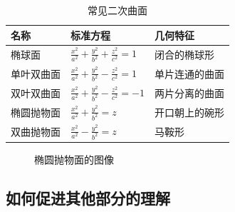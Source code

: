 \begin{table}[htbp]
\centering
\caption{常见二次曲面}
\begin{tabularx}{0.95\textwidth}{llX}
\toprule
\textbf{名称} & \textbf{标准方程} & \textbf{几何特征} \\
\midrule
椭球面 & $\frac{x^2}{a^2}+\frac{y^2}{b^2}+\frac{z^2}{c^2}=1$ & 闭合的椭球形 \\
单叶双曲面 & $\frac{x^2}{a^2}+\frac{y^2}{b^2}-\frac{z^2}{c^2}=1$ & 单片连通的曲面 \\
双叶双曲面 & $\frac{x^2}{a^2}+\frac{y^2}{b^2}-\frac{z^2}{c^2}=-1$ & 两片分离的曲面 \\
椭圆抛物面 & $\frac{x^2}{a^2}+\frac{y^2}{b^2}=z$ & 开口朝上的碗形 \\
双曲抛物面 & $\frac{x^2}{a^2}-\frac{y^2}{b^2}=z$ & 马鞍形 \\
\bottomrule
\end{tabularx}
\end{table}

\begin{figure}[htbp]
\centering
{}
\caption{椭圆抛物面的图像}
\end{figure}

\subsection{如何促进其他部分的理解}

